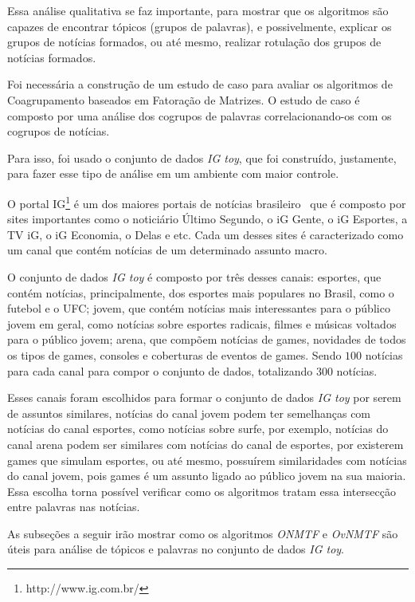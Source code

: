 \documentclass[
    12pt,                %
    oneside,            %
    a4paper,            %
    english,            %
    brazil                %
    ]{abntex2ppgsi}
\begin{document}
Essa análise qualitativa se faz importante, para mostrar que os algoritmos são capazes de encontrar tópicos (grupos de palavras), e possivelmente, explicar os grupos de notícias formados, ou até mesmo, realizar rotulação dos grupos de notícias formados.

Foi necessária a construção de um estudo de caso para avaliar os algoritmos de Coagrupamento baseados em Fatoração de Matrizes.
O estudo de caso é composto por uma análise dos cogrupos de palavras correlacionando-os com os cogrupos de notícias.

Para isso, foi usado o conjunto de dados \textit{IG toy}, que foi construído, justamente, para fazer esse tipo de análise em um ambiente com maior controle.

O portal IG\footnote{http://www.ig.com.br/} é um dos maiores portais de notícias brasileiro~\cite{topsites} que é composto por sites importantes como o noticiário Último Segundo, o iG Gente, o iG Esportes, a TV iG, o iG Economia, o Delas e etc.
Cada um desses sites é caracterizado como um canal que contém notícias de um determinado assunto macro.

O conjunto de dados \textit{IG toy} é composto por três desses canais: esportes, que contém notícias, principalmente, dos esportes mais populares no Brasil, como o futebol e o UFC; jovem, que contém notícias mais interessantes para o público jovem em geral, como notícias sobre esportes radicais, filmes e músicas voltados para o público jovem; arena, que compõem notícias de games, novidades de todos os tipos de games, consoles e coberturas de eventos de games.
Sendo $100$ notícias para cada canal para compor o conjunto de dados, totalizando $300$ notícias.

Esses canais foram escolhidos para formar o conjunto de dados \textit{IG toy} por serem de assuntos similares, notícias do canal jovem podem ter semelhanças com notícias do canal esportes, como notícias sobre surfe, por exemplo, notícias do canal arena podem ser similares com notícias do canal de esportes, por existerem games que simulam esportes, ou até mesmo, possuírem similaridades com notícias do canal jovem, pois games é um assunto ligado ao público jovem na sua maioria.
Essa escolha torna possível verificar como os algoritmos tratam essa intersecção entre palavras nas notícias.

As subseções a seguir irão mostrar como os algoritmos \textit{ONMTF} e \textit{OvNMTF} são úteis para análise de tópicos e palavras no conjunto de dados \textit{IG toy}.
\end{document}
